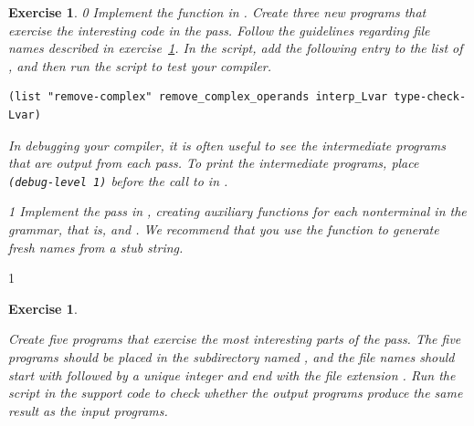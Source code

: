 \documentclass[7x10]{TimesAPriori_MIT}%
\def\racketEd{0}
\def\pythonEd{1}
\def\edition{1}
\newcommand{\pythonColor}[0]{}
\newtheorem{exercise}[theorem]{Exercise}
\numberwithin{theorem}{chapter}
\numberwithin{definition}{chapter}
\numberwithin{equation}{chapter}
\begin{document}
\begin{exercise}
  \normalfont\normalsize
{\if\edition\racketEd  
Implement the  function in
.
%
Create three new \LangVar{} programs that exercise the interesting
code in the  pass.  Follow the guidelines
regarding file names described in exercise~\ref{ex:Lvar}.
%
In the  script, add the following entry to the
list of , and then run the script to test your compiler.
\begin{lstlisting}
(list "remove-complex" remove_complex_operands interp_Lvar type-check-Lvar)
\end{lstlisting}
In debugging your compiler, it is often useful to see the intermediate
programs that are output from each pass. To print the intermediate
programs, place \lstinline{(debug-level 1)} before the call to
 in .  \fi}
%
{\if\edition\pythonEd\pythonColor
  Implement the  pass in
  , creating auxiliary functions for each
  nonterminal in the grammar, that is, 
  and . We recommend that you use the function
   to generate fresh names from a stub string.
\fi}  
\end{exercise}

{\if\edition\pythonEd\pythonColor
\begin{exercise}
\normalfont\normalsize
\label{ex:Lvar}

Create five \LangVar{} programs that exercise the most interesting
parts of the  pass.  The five programs
should be placed in the subdirectory named , and the file
names should start with  followed by a unique
integer and end with the file extension .
Run the  script in the support code to check
whether the output programs produce the same result as the input
programs.
\end{exercise}

\fi}
\end{document}
